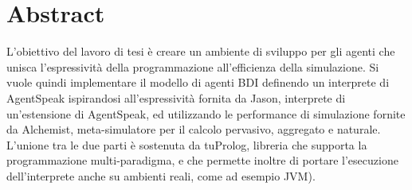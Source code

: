 \chapter*{Abstract} %




L'obiettivo del lavoro di tesi è creare un ambiente di sviluppo per gli agenti che unisca l'espressività della programmazione all'efficienza della simulazione.
Si vuole quindi implementare il modello di agenti BDI definendo un interprete di AgentSpeak ispirandosi all'espressività fornita da Jason, interprete di un'estensione di AgentSpeak, ed utilizzando le performance di simulazione fornite da Alchemist, meta-simulatore per il calcolo pervasivo, aggregato e naturale.
L'unione tra le due parti è sostenuta da tuProlog, libreria che supporta la programmazione multi-paradigma, e che permette inoltre di portare l'esecuzione dell'interprete anche su ambienti reali, come ad esempio JVM).

\clearpage{\pagestyle{empty}\cleardoublepage}

\tableofcontents

\rhead[\fancyplain{}{\bfseries\leftmark}]{\fancyplain{}{\bfseries\thepage}}

\clearpage{\pagestyle{empty}\cleardoublepage}

\listoffigures

\clearpage{\pagestyle{empty}\cleardoublepage}


\clearpage{\pagestyle{empty}\cleardoublepage}

\lstlistoflistings

\clearpage{\pagestyle{empty}\cleardoublepage}